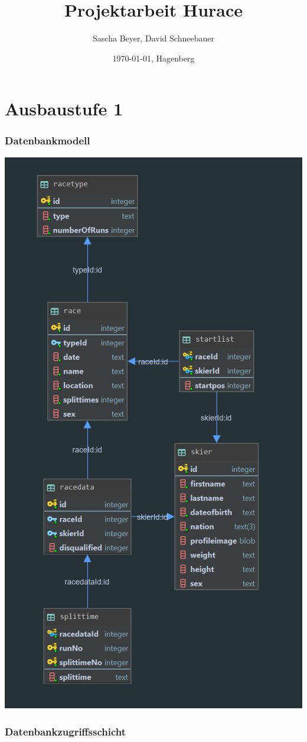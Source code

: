 \documentclass[a4paper, 12pt]{article}
\title{Projektarbeit Hurace}
\author{Sascha Beyer, David Schneebauer}
\date{\today{}, Hagenberg}
\begin{document}
	\maketitle
	\tableofcontents
	\newpage
	\section{Ausbaustufe 1}
	\subsubsection{Datenbankmodell}

	\includegraphics[width=.7\textwidth]{img/huraceDB.png}
	\subsubsection{Datenbankzugriffsschicht}
	\newpage	
\end{document}
